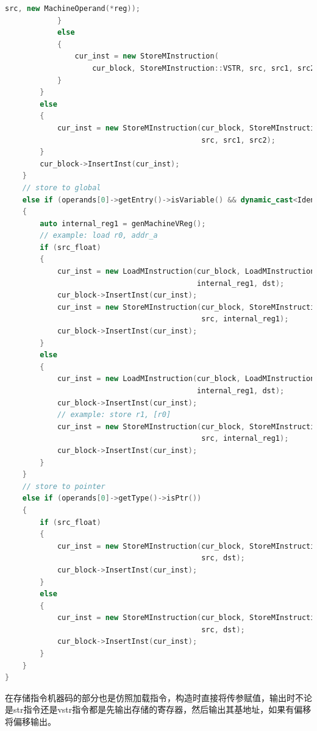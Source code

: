 \documentclass[UTF8,a4paper,10pt]{ctexart}
\begin{document}
\begin{lstlisting}[title = 生成目标代码, language = c++]
                                          src, new MachineOperand(*reg));
            }
            else
            {
                cur_inst = new StoreMInstruction(
                    cur_block, StoreMInstruction::VSTR, src, src1, src2);
            }
        }
        else
        {
            cur_inst = new StoreMInstruction(cur_block, StoreMInstruction::STR,
                                             src, src1, src2);
        }
        cur_block->InsertInst(cur_inst);
    }
    // store to global
    else if (operands[0]->getEntry()->isVariable() && dynamic_cast<IdentifierSymbolEntry *>(operands[0]->getEntry())->isGlobal())
    {
        auto internal_reg1 = genMachineVReg();
        // example: load r0, addr_a
        if (src_float)
        {
            cur_inst = new LoadMInstruction(cur_block, LoadMInstruction::LDR,
                                            internal_reg1, dst);
            cur_block->InsertInst(cur_inst);
            cur_inst = new StoreMInstruction(cur_block, StoreMInstruction::VSTR,
                                             src, internal_reg1);
            cur_block->InsertInst(cur_inst);
        }
        else
        {
            cur_inst = new LoadMInstruction(cur_block, LoadMInstruction::LDR,
                                            internal_reg1, dst);
            cur_block->InsertInst(cur_inst);
            // example: store r1, [r0]
            cur_inst = new StoreMInstruction(cur_block, StoreMInstruction::STR,
                                             src, internal_reg1);
            cur_block->InsertInst(cur_inst);
        }
    }
    // store to pointer
    else if (operands[0]->getType()->isPtr())
    {
        if (src_float)
        {
            cur_inst = new StoreMInstruction(cur_block, StoreMInstruction::VSTR,
                                             src, dst);
            cur_block->InsertInst(cur_inst);
        }
        else
        {
            cur_inst = new StoreMInstruction(cur_block, StoreMInstruction::STR,
                                             src, dst);
            cur_block->InsertInst(cur_inst);
        }
    }
}
\end{lstlisting}

在存储指令机器码的部分也是仿照加载指令，构造时直接将传参赋值，输出时不论是str指令还是vstr指令都是先输出存储的寄存器，然后输出其基地址，如果有偏移将偏移输出。
\end{document}
